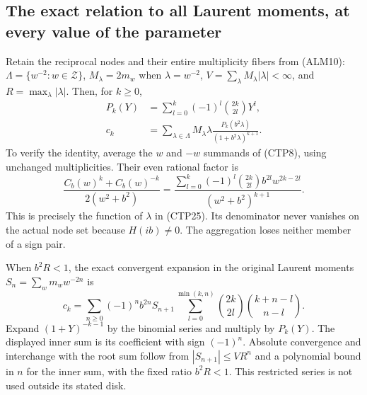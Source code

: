 \subsection{The exact relation to all Laurent moments, at every value of the parameter}

Retain the reciprocal nodes and their entire multiplicity fibers
from (ALM10): $\Lambda=\{w^{-2}:w\in\mathcal Z\}$,
$M_\lambda=2m_w$ when $\lambda=w^{-2}$,
$V=\sum_\lambda M_\lambda|\lambda|<\infty$, and
$R=\max_\lambda|\lambda|$. Then, for $k\ge0$,
\begin{equation}\tag{CTP25}
\begin{split}
 P_k(Y)&=\sum_{l=0}^k(-1)^l\binom{2k}{2l}Y^l,\\
 c_k&=\sum_{\lambda\in\Lambda}M_\lambda\lambda
                 \frac{P_k(b^2\lambda)}{(1+b^2\lambda)^{k+1}}.
\end{split}
\end{equation}
To verify the identity, average the $w$ and $-w$ summands of
(CTP8), using unchanged multiplicities. Their even rational factor is
\[
 \frac{C_b(w)^k+C_b(w)^{-k}}{2(w^2+b^2)}
 =\frac{\sum_{l=0}^k(-1)^l\binom{2k}{2l}b^{2l}w^{2k-2l}}
             {(w^2+b^2)^{k+1}}.
\]
This is precisely the function of $\lambda$ in (CTP25).
Its denominator never vanishes on the actual node set because
$H(ib)\ne0$. The aggregation loses neither member of a sign pair.

When $b^2R<1$, the exact convergent expansion in the original
Laurent moments $S_n=\sum_wm_ww^{-2n}$ is
\begin{equation}\tag{CTP26}
 c_k=\sum_{n\ge0}(-1)^nb^{2n}S_{n+1}
       \sum_{l=0}^{\min(k,n)}\binom{2k}{2l}\binom{k+n-l}{n-l}.
\end{equation}
Expand $(1+Y)^{-k-1}$ by the binomial series and multiply by
$P_k(Y)$. The displayed inner sum is its coefficient with sign
$(-1)^n$. Absolute convergence and interchange with the root sum
follow from $|S_{n+1}|\le VR^n$ and a polynomial bound in $n$ for
the inner sum, with the fixed ratio $b^2R<1$.
This restricted series is not used outside its stated disk.

